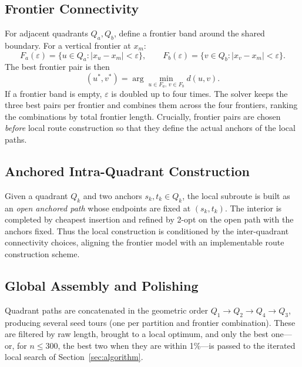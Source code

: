 \documentclass[runningheads]{llncs}
\begin{document}
\subsection{Frontier Connectivity}

For adjacent quadrants $Q_a,Q_b$, define a frontier band around the
shared boundary. For a vertical frontier at $x_m$:
\begin{equation}
F_a(\varepsilon)=\{u\in Q_a:|x_u-x_m|<\varepsilon\}, \qquad
F_b(\varepsilon)=\{v\in Q_b:|x_v-x_m|<\varepsilon\}.
\end{equation}
The best frontier pair is then
\begin{equation}
(u^*,v^*)=\arg\min_{u\in F_a,\,v\in F_b} d(u,v).
\label{eq:frontier}
\end{equation}
If a frontier band is empty, $\varepsilon$ is doubled up to four times.
The solver keeps the three best pairs per frontier and combines them
across the four frontiers, ranking the combinations by total frontier
length. Crucially, frontier pairs are chosen \emph{before} local route
construction so that they define the actual anchors of the local paths.

\subsection{Anchored Intra-Quadrant Construction}

Given a quadrant $Q_k$ and two anchors $s_k,t_k\in Q_k$, the local
subroute is built as an \emph{open anchored path} whose endpoints are
fixed at $(s_k,t_k)$. The interior is completed by cheapest insertion
and refined by 2-opt on the open path with the anchors fixed. Thus the
local construction is conditioned by the inter-quadrant connectivity
choices, aligning the frontier model with an implementable route
construction scheme.

\subsection{Global Assembly and Polishing}

Quadrant paths are concatenated in the geometric order
$Q_1\!\to\!Q_2\!\to\!Q_4\!\to\!Q_3$, producing several seed tours (one
per partition and frontier combination). These are filtered by raw
length, brought to a local optimum, and only the best one---or, for
$n\le 300$, the best two when they are within 1\%---is passed to the
iterated local search
of Section~\ref{sec:algorithm}.

\end{document}
